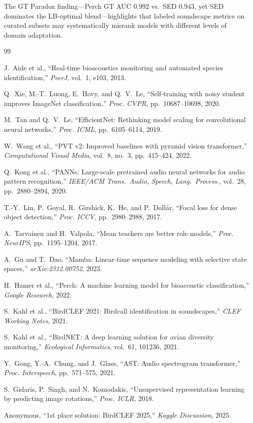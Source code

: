 \documentclass[journal]{IEEEtran}
\begin{document}
The GT Paradox finding---Perch GT AUC 0.992 vs.\ SED 0.943, yet SED dominates the LB-optimal blend---highlights that labeled soundscape metrics on curated subsets may systematically misrank models with different levels of domain adaptation.


\begin{thebibliography}{99}

J.~Aide et al.,
``Real-time bioacoustics monitoring and automated species identification,''
\emph{PeerJ}, vol.~1, e103, 2013.

Q.~Xie, M.-T.~Luong, E.~Hovy, and Q.~V.~Le,
``Self-training with noisy student improves ImageNet classification,''
\emph{Proc. CVPR}, pp.~10687--10698, 2020.

M.~Tan and Q.~V.~Le,
``EfficientNet: Rethinking model scaling for convolutional neural networks,''
\emph{Proc. ICML}, pp.~6105--6114, 2019.

W.~Wang et al.,
``PVT v2: Improved baselines with pyramid vision transformer,''
\emph{Computational Visual Media}, vol.~8, no.~3, pp.~415--424, 2022.

Q.~Kong et al.,
``PANNs: Large-scale pretrained audio neural networks for audio pattern recognition,''
\emph{IEEE/ACM Trans.\ Audio, Speech, Lang.\ Process.}, vol.~28, pp.~2880--2894, 2020.

T.-Y.~Lin, P.~Goyal, R.~Girshick, K.~He, and P.~Doll{\'a}r,
``Focal loss for dense object detection,''
\emph{Proc. ICCV}, pp.~2980--2988, 2017.

A.~Tarvainen and H.~Valpola,
``Mean teachers are better role models,''
\emph{Proc. NeurIPS}, pp.~1195--1204, 2017.

A.~Gu and T.~Dao,
``Mamba: Linear-time sequence modeling with selective state spaces,''
\emph{arXiv:2312.00752}, 2023.

H.~Hamer et al.,
``Perch: A machine learning model for bioacoustic classification,''
\emph{Google Research}, 2022.

S.~Kahl et al.,
``BirdCLEF 2021: Birdcall identification in soundscapes,''
\emph{CLEF Working Notes}, 2021.

S.~Kahl et al.,
``BirdNET: A deep learning solution for avian diversity monitoring,''
\emph{Ecological Informatics}, vol.~61, 101236, 2021.

Y.~Gong, Y.-A.~Chung, and J.~Glass,
``AST: Audio spectrogram transformer,''
\emph{Proc. Interspeech}, pp.~571--575, 2021.

S.~Gidaris, P.~Singh, and N.~Komodakis,
``Unsupervised representation learning by predicting image rotations,''
\emph{Proc. ICLR}, 2018.

Anonymous,
``1st place solution: BirdCLEF 2025,''
\emph{Kaggle Discussion}, 2025.

\end{thebibliography}
\end{document}
